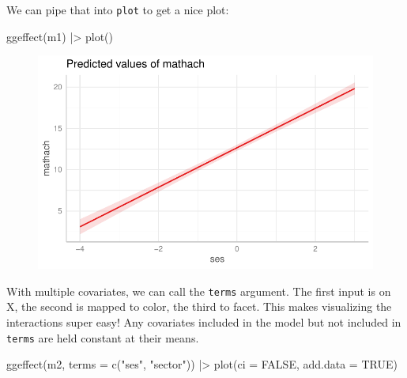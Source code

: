 \documentclass[
  letterpaper,
  DIV=11,
  numbers=noendperiod]{scrreprt}
\newenvironment{Shaded}{\begin{snugshade}}{\end{snugshade}}
\newcommand{\AttributeTok}[1]{\textcolor[rgb]{0.49,0.56,0.16}{#1}}
\newcommand{\ConstantTok}[1]{\textcolor[rgb]{0.53,0.00,0.00}{#1}}
\newcommand{\FunctionTok}[1]{\textcolor[rgb]{0.02,0.16,0.49}{#1}}
\newcommand{\NormalTok}[1]{\textcolor[rgb]{0.00,0.44,0.13}{#1}}
\newcommand{\SpecialCharTok}[1]{\textcolor[rgb]{0.25,0.44,0.63}{#1}}
\newcommand{\StringTok}[1]{\textcolor[rgb]{0.25,0.44,0.63}{#1}}
\begin{document}
We can pipe that into \texttt{plot} to get a nice plot:

\begin{Shaded}
\begin{Highlighting}[]
\FunctionTok{ggeffect}\NormalTok{(m1) }\SpecialCharTok{|\textgreater{}} 
  \FunctionTok{plot}\NormalTok{()}
\end{Highlighting}
\end{Shaded}

\begin{figure}[H]

{\centering \includegraphics{ggeffects_files/figure-pdf/unnamed-chunk-5-1.pdf}

}

\end{figure}

With multiple covariates, we can call the \texttt{terms} argument. The
first input is on X, the second is mapped to color, the third to facet.
This makes visualizing the interactions super easy! Any covariates
included in the model but not included in \texttt{terms} are held
constant at their means.

\begin{Shaded}
\begin{Highlighting}[]
\FunctionTok{ggeffect}\NormalTok{(m2, }\AttributeTok{terms =} \FunctionTok{c}\NormalTok{(}\StringTok{"ses"}\NormalTok{, }\StringTok{"sector"}\NormalTok{)) }\SpecialCharTok{|\textgreater{}} 
  \FunctionTok{plot}\NormalTok{(}\AttributeTok{ci =} \ConstantTok{FALSE}\NormalTok{, }\AttributeTok{add.data =} \ConstantTok{TRUE}\NormalTok{)}
\end{Highlighting}
\end{Shaded}
\end{document}
